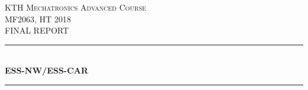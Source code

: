 \documentclass[11pt, titlepage]{article} %
\begin{document}
{} %



\begin{titlepage} %
	\newcommand{\HRule}{\rule{\linewidth}{0.5mm}} %
	
	\center %
	
	
	\begin{figure}
   		\centering
	\end{figure}
	
	\textsc{\LARGE KTH Mechatronics Advanced Course}\\[1cm] %
	
	\textsc{\Large MF2063, HT 2018}\\[0.5cm] %
	
	\textsc{\Large FINAL REPORT}\\[0.5cm] %
	
	
	\HRule\\[0.4cm]
	
	{\huge\bfseries ESS-NW/ESS-CAR}\\[0.4cm] %
	
	\HRule\\[1.5cm]	
	
	

\end{titlepage}
\end{document}
